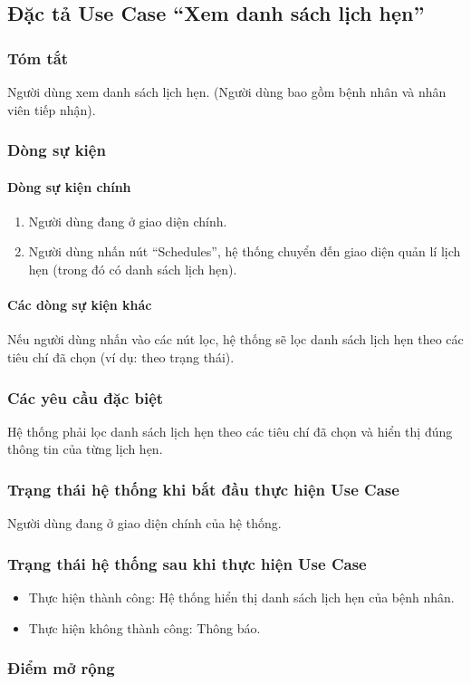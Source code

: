 \subsection{Đặc tả Use Case ``Xem danh sách lịch hẹn''}

\subsubsection{Tóm tắt}
Người dùng xem danh sách lịch hẹn. (Người dùng bao gồm bệnh nhân và nhân viên tiếp nhận).

\subsubsection{Dòng sự kiện}
\paragraph{\textbf{Dòng sự kiện chính}}
\begin{enumerate}
  \item Người dùng đang ở giao diện chính.
  \item Người dùng nhấn nút ``Schedules'', hệ thống chuyển đến giao diện quản lí lịch hẹn (trong đó có danh sách lịch hẹn).
\end{enumerate}

\paragraph{\textbf{Các dòng sự kiện khác}}
Nếu người dùng nhấn vào các nút lọc, hệ thống sẽ lọc danh sách lịch hẹn theo các tiêu chí đã chọn (ví dụ: theo trạng thái).

\subsubsection{Các yêu cầu đặc biệt}
Hệ thống phải lọc danh sách lịch hẹn theo các tiêu chí đã chọn và hiển thị đúng thông tin của từng lịch hẹn.

\subsubsection{Trạng thái hệ thống khi bắt đầu thực hiện Use Case}
Người dùng đang ở giao diện chính của hệ thống.

\subsubsection{Trạng thái hệ thống sau khi thực hiện Use Case}
\begin{itemize}
  \item Thực hiện thành công: Hệ thống hiển thị danh sách lịch hẹn của bệnh nhân.
  \item Thực hiện không thành công: Thông báo.
\end{itemize}

\subsubsection{Điểm mở rộng}
